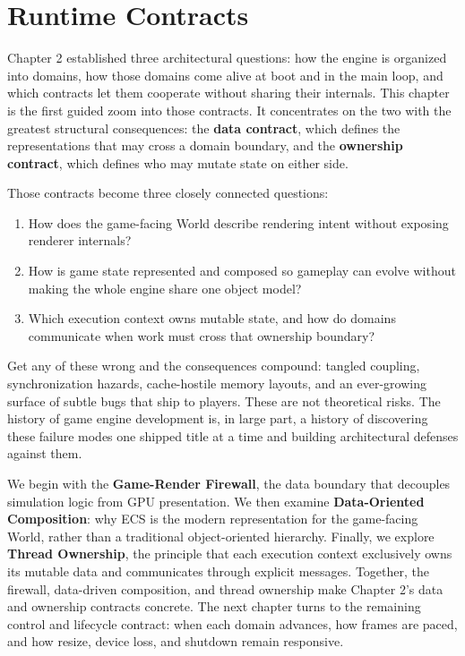 \documentclass[
  11pt,
  letterpaper,
  DIV=11,
  numbers=noendperiod,
  twoside,
  open=right]{scrreprt}
\providecommand{\tightlist}{%
  \setlength{\itemsep}{0pt}\setlength{\parskip}{0pt}}
\begin{document}
\chapter{Runtime Contracts}\label{runtime-contracts}

Chapter 2 established three architectural questions: how the engine is
organized into domains, how those domains come alive at boot and in the
main loop, and which contracts let them cooperate without sharing their
internals. This chapter is the first guided zoom into those contracts.
It concentrates on the two with the greatest structural consequences:
the \textbf{data contract}, which defines the representations that may
cross a domain boundary, and the \textbf{ownership contract}, which
defines who may mutate state on either side.

Those contracts become three closely connected questions:

\begin{enumerate}
\def\labelenumi{\arabic{enumi}.}
\tightlist
\item
  How does the game-facing World describe rendering intent without
  exposing renderer internals?
\item
  How is game state represented and composed so gameplay can evolve
  without making the whole engine share one object model?
\item
  Which execution context owns mutable state, and how do domains
  communicate when work must cross that ownership boundary?
\end{enumerate}

Get any of these wrong and the consequences compound: tangled coupling,
synchronization hazards, cache-hostile memory layouts, and an
ever-growing surface of subtle bugs that ship to players. These are not
theoretical risks. The history of game engine development is, in large
part, a history of discovering these failure modes one shipped title at
a time and building architectural defenses against them.

We begin with the \textbf{Game-Render Firewall}, the data boundary that
decouples simulation logic from GPU presentation. We then examine
\textbf{Data-Oriented Composition}: why ECS is the modern representation
for the game-facing World, rather than a traditional object-oriented
hierarchy. Finally, we explore \textbf{Thread Ownership}, the principle
that each execution context exclusively owns its mutable data and
communicates through explicit messages. Together, the firewall,
data-driven composition, and thread ownership make Chapter 2's data and
ownership contracts concrete. The next chapter turns to the remaining
control and lifecycle contract: when each domain advances, how frames
are paced, and how resize, device loss, and shutdown remain responsive.
\end{document}
